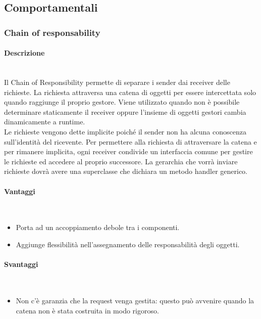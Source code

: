 \subsection{Comportamentali}
\subsubsection{Chain of responsability}
\paragraph{Descrizione} \mbox{} \\
Il Chain of Responsibility permette di separare i sender dai receiver delle richieste. La richiesta attraversa una catena di oggetti per essere intercettata solo quando raggiunge il proprio gestore. Viene utilizzato quando non è possibile determinare staticamente il receiver oppure l’insieme di oggetti gestori cambia dinamicamente a runtime. \\
Le richieste vengono dette implicite poiché il sender non ha alcuna conoscenza sull’identità del ricevente. Per permettere alla richiesta di attraversare la catena e per rimanere implicita, ogni receiver condivide un interfaccia comune per gestire le richieste ed accedere al proprio successore. La gerarchia che vorrà inviare richieste dovrà avere una superclasse che dichiara un metodo handler generico.
\paragraph{Vantaggi} \mbox{} \\
\begin{itemize}
\item Porta ad un accoppiamento debole tra i componenti.
\item Aggiunge flessibilità nell’assegnamento delle responsabilità degli oggetti.
\end{itemize}
\paragraph{Svantaggi} \mbox{} \\
\begin{itemize}
\item Non c’è garanzia che la request venga gestita: questo può avvenire quando la catena non è stata costruita in modo rigoroso.
\end{itemize}
